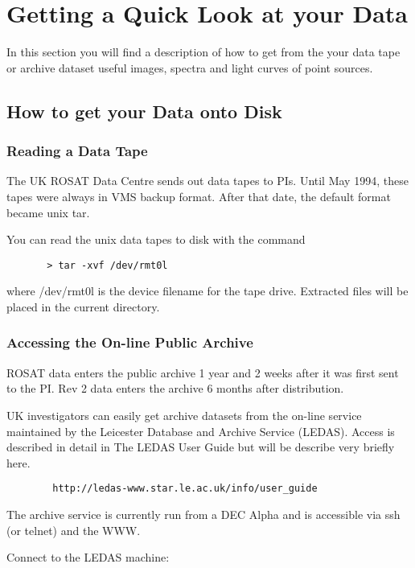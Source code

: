 \documentclass[11pt,fleqn]{article}    %
\begin{document}
\newpage
\section{Getting a Quick Look at your Data}
In this section you will find a description of how to get from the your
data tape or archive dataset useful images, spectra and light curves of
point sources.

\subsection{How to get your Data onto Disk}

\subsubsection{Reading a Data Tape}
The UK ROSAT Data Centre sends out data tapes to PIs. Until May 1994,
these tapes were always in VMS backup format. After that date, the
default format became unix tar.

You can read the unix data tapes to disk with the command

\begin{verbatim}
       > tar -xvf /dev/rmt0l
\end{verbatim} 

where /dev/rmt0l is the device filename for the tape drive.  Extracted
files will be placed in the current directory.

\subsubsection{Accessing the On-line Public Archive}
ROSAT data enters the public archive 1 year and 2 weeks after it was first sent
to the PI. Rev 2 data enters the archive 6 months after distribution.

UK investigators can easily get archive datasets from the on-line service
maintained by the Leicester Database and Archive Service (LEDAS). Access
is described in detail in The LEDAS User Guide but will be describe very
briefly here.

\begin{verbatim}
        http://ledas-www.star.le.ac.uk/info/user_guide
\end{verbatim}

The archive service is currently run from a DEC Alpha and is accessible via
ssh (or telnet) and the WWW.

Connect to the LEDAS machine:
\end{document}
